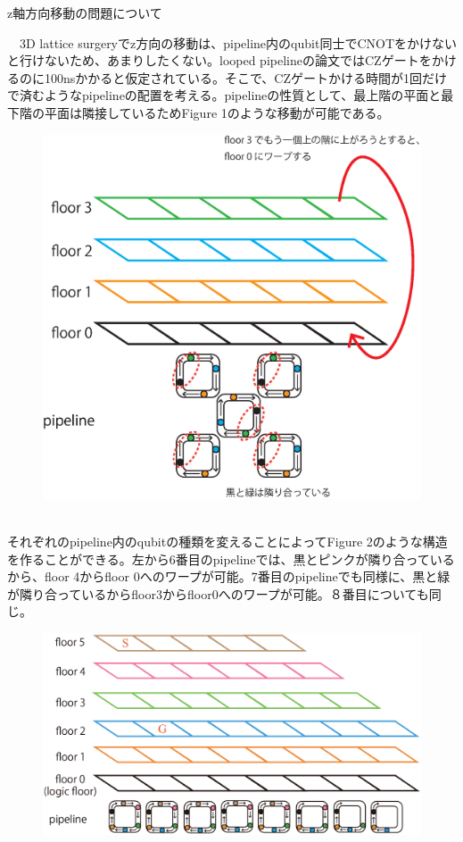 \documentclass[a4paper,10.5pt]{ltjsarticle}
\begin{document}
\centerline{\Large     z軸方向移動の問題について}
\centerline{}
　3D lattice surgeryでz方向の移動は、pipeline内のqubit同士でCNOTをかけないと行けないため、あまりしたくない。looped pipelineの論文ではCZゲートをかけるのに100nsかかると仮定されている。そこで、CZゲートかける時間が1回だけで済むようなpipelineの配置を考える。pipelineの性質として、最上階の平面と最下階の平面は隣接しているためFigure 1のような移動が可能である。\\
\begin{figure}[h]
  \centering
  \includegraphics[scale=0.6]{figure1.eps}
  \vspace{-20pt}\caption{}
\end{figure}\\
それぞれのpipeline内のqubitの種類を変えることによってFigure 2のような構造を作ることができる。左から6番目のpipelineでは、黒とピンクが隣り合っているから、floor 4からfloor 0へのワープが可能。7番目のpipelineでも同様に、黒と緑が隣り合っているからfloor3からfloor0へのワープが可能。８番目についても同じ。
\begin{figure}[h]
  \centering
  \includegraphics[scale=0.5]{figure2.eps}
  \vspace{-20pt}\caption{}
\end{figure}
\end{document}
